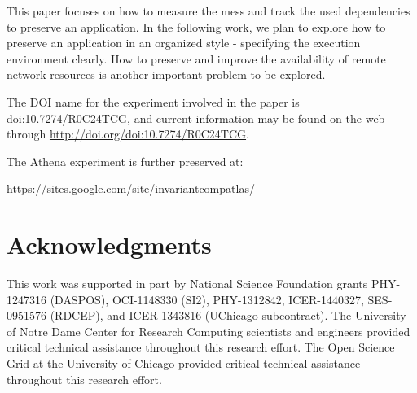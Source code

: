 \documentclass[procedia]{easychair}
\begin{document}
This paper focuses on how to measure the mess and track the used dependencies to preserve an application.
In the following work, we plan to explore how to preserve an application in an organized style - specifying the execution environment clearly.
How to preserve and improve the availability of remote network resources is another important problem to be explored.

The DOI name for the experiment involved in the paper is \url{doi:10.7274/R0C24TCG}, and current information may be found on the web through \url{http://doi.org/doi:10.7274/R0C24TCG}.

The Athena experiment is further preserved at: 

\indent \indent \indent \indent \indent \url{https://sites.google.com/site/invariantcompatlas/} 

\section*{Acknowledgments}

This work was supported in part by National Science Foundation grants PHY-1247316 (DASPOS), 
OCI-1148330 (SI2), PHY-1312842, ICER-1440327, SES-0951576 (RDCEP), and ICER-1343816 (UChicago subcontract).
The University of Notre Dame Center for Research Computing scientists and engineers provided critical technical assistance throughout this research effort.
The Open Science Grid at the University of Chicago provided critical technical assistance throughout this research effort.

\vspace{-10pt}


\end{document}
